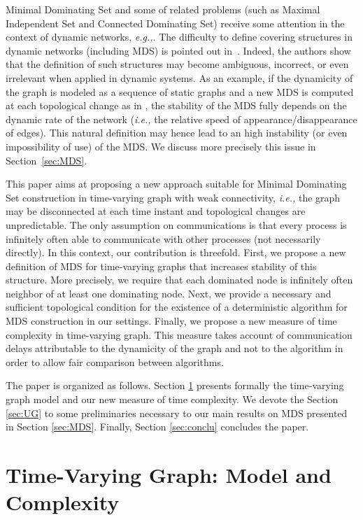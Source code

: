 \documentclass{article}
\newcommand{\ie}{{\em i.e.,}\xspace}
\newcommand{\eg}{{\em e.g.,}\xspace}
\begin{document}
Minimal Dominating Set and some of related problems (such as Maximal Independent Set and Connected Dominating Set) receive some attention in the context of dynamic networks, \eg \cite{BDTC05,WDCG12,SW10,CMM11}. The difficulty to define covering structures in dynamic networks (including MDS) is pointed out in~\cite{CF13r}. Indeed, the authors show that the definition of such structures may become ambiguous, incorrect, or even irrelevant when applied in dynamic systems. As an example, if the dynamicity of the graph is modeled as a sequence of static graphs and a new MDS is computed at each topological change as in \cite{WDCG12}, the stability of the MDS fully depends on the dynamic rate of the network (\ie the relative speed of appearance/disappearance of edges). This natural definition may hence lead to an high instability (or even impossibility of use) of the MDS. We discuss more precisely this issue in Section~\ref{sec:MDS}.

This paper aims at proposing a new approach suitable for Minimal Dominating Set construction in time-varying graph with weak connectivity, \ie the graph may be disconnected at each time instant and topological changes are unpredictable. The only assumption on communications is that every process is infinitely often able to communicate with other processes (not necessarily directly). In this context, our contribution is threefold. First, we propose a new definition of MDS for time-varying graphs that increases stability of this structure. More precisely, we require that each dominated node is infinitely often neighbor of at least one dominating node. Next, we provide a necessary and sufficient topological condition for the existence of a deterministic algorithm for MDS construction in our settings. Finally, we propose a new measure of time complexity in time-varying graph. This measure takes account of communication delays attributable to the dynamicity of the graph and not to the algorithm in order to allow fair comparison between algorithms.

The paper is organized as follows. Section \ref{sec:TVG} presents formally the time-varying graph model and our new measure of time complexity. We devote the Section \ref{sec:UG} to some preliminaries necessary to our main results on MDS presented in Section \ref{sec:MDS}. Finally, Section \ref{sec:conclu} concludes the paper.

\section{Time-Varying Graph: Model and Complexity}\label{sec:TVG}
\end{document}
